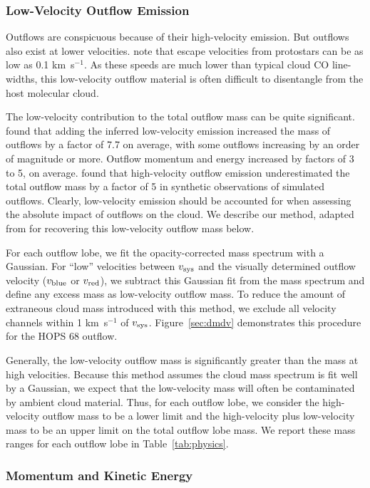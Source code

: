 \documentclass[twocolumn]{aastex63}
\newcommand{\example}{HOPS 68}
\newcommand{\kms}{km~s$^{-1}$}
\begin{document}
\subsubsection{Low-Velocity Outflow Emission}\label{sec:lowvelocity}
Outflows are conspicuous because of their high-velocity emission. But outflows also exist at lower velocities. \citet{Dunham14} note that escape velocities from protostars can be as low as 0.1 \kms. As these speeds are much lower than typical cloud CO line-widths, this low-velocity outflow material is often difficult to disentangle from the host molecular cloud.

The low-velocity contribution to the total outflow mass can be quite significant. \citet{Dunham14} found that adding the inferred low-velocity emission increased the mass of outflows by a factor of 7.7 on average, with some outflows increasing by an order of magnitude or more. Outflow momentum and energy increased by factors of 3 to 5, on average. \citet{Offner11} found that high-velocity outflow emission underestimated the total outflow mass by a factor of 5 in synthetic observations of simulated outflows. Clearly, low-velocity emission should be accounted for when assessing the absolute impact of outflows on the cloud. We describe our method, adapted from \citet{Dunham14} for recovering this low-velocity outflow mass below. 

For each outflow lobe, we fit the opacity-corrected mass spectrum with a Gaussian. For ``low'' velocities between $v_{\rm sys}$ and the visually determined outflow velocity ($v_{\rm blue}$ or $v_{\rm red}$), we subtract this Gaussian fit from the mass spectrum and define any excess mass as low-velocity outflow mass. To reduce the amount of extraneous cloud mass introduced with this method, we exclude all velocity channels within 1 \kms{} of $v_{\rm sys}$. Figure~\ref{sec:dmdv} demonstrates this procedure for the \example{} outflow. 

Generally, the low-velocity outflow mass is significantly greater than the mass at high velocities. Because this method assumes the cloud mass spectrum is fit well by a Gaussian, we expect that the low-velocity mass will often be contaminated by ambient cloud material. Thus, for each outflow lobe, we consider the high-velocity outflow mass to be a lower limit and the high-velocity plus low-velocity mass to be an upper limit on the total outflow lobe mass. We report these mass ranges for each outflow lobe in Table~\ref{tab:physics}.

\subsubsection{Momentum and Kinetic Energy}
\end{document}
